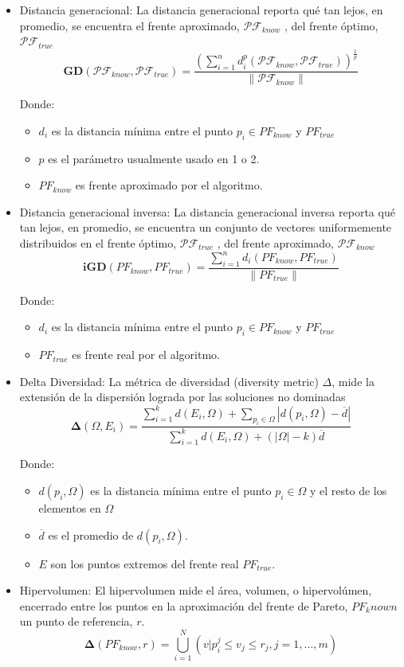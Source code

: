 \documentclass[letterpaper,10pt]{article}
\begin{document}
\begin{itemize}
 \item Distancia generacional: La distancia generacional reporta qué tan lejos, en promedio, se encuentra el frente aproximado, $\mathcal{PF}_{know}$ , del frente óptimo, $\mathcal{PF}_{true}$
 $$\bm{GD}(\mathcal{PF}_{know},\mathcal{PF}_{true})=\frac{(\sum^n_{i=1} d_i^p(\mathcal{PF}_{know},\mathcal{PF}_{true}))^{\frac{1}{p}}}{\|\mathcal{PF}_{know}\|}$$
 
 Donde:
 \begin{itemize}
  \item $d_i$ es la distancia mínima entre el punto $p_i \in PF_{know}$ y $PF_{true}$  
  \item $p$ es el parámetro usualmente usado en 1 o 2.
  \item $PF_{know}$ es frente aproximado por el algoritmo.
 \end{itemize}
 
 
 \item Distancia generacional inversa: La distancia generacional inversa reporta qué tan lejos, en promedio, se encuentra un conjunto de vectores uniformemente distribuidos en el frente óptimo, $\mathcal{PF}_{true}$ , del frente aproximado, $\mathcal{PF}_{know}$
 $$\bm{iGD}(PF_{know},PF_{true})=\frac{\sum^n_{i=1} d_i(PF_{know},PF_{true})}{\|PF_{true}\|}$$
 
 Donde:
 \begin{itemize}
  \item $d_i$ es la distancia mínima entre el punto $p_i \in PF_{know}$ y $PF_{true}$  
  \item $PF_{true}$ es frente real por el algoritmo.
 \end{itemize}

 \item Delta Diversidad: La métrica de diversidad (diversity metric) $\Delta$, mide la extensión de la dispersión lograda por las soluciones no dominadas
 $$\bm{\Delta}(\Omega,E_i)=\frac{\sum^k_{i=1} d(E_i,\Omega) + \sum_{p_i \in \Omega} |d(p_i,\Omega)-\overline{d}|}{\sum^k_{i=1} d(E_i,\Omega) + (|\Omega| - k)\overline{d}}$$
 
 Donde:
 \begin{itemize}
  \item $d(p_i,\Omega)$ es la distancia mínima entre el punto $p_i \in \Omega$ y el resto de los elementos en $\Omega$  
  \item $\overline{d}$ es el promedio de $d(p_i,\Omega)$.
  \item $E$ son los puntos extremos del frente real $PF_{true}$.
 \end{itemize}

 \item Hipervolumen: El hipervolumen mide el área, volumen, o hipervolúmen, encerrado entre los puntos en la aproximación del frente de Pareto, $PF_known$
un punto de referencia, $r$.
 $$\bm{\Delta}(PF_{know},r)=\bigcup^N_{i=1} (v|p^j_i \leq v_j \leq r_j , j = 1, \dots, m) $$
 
\end{itemize}
\end{document}
